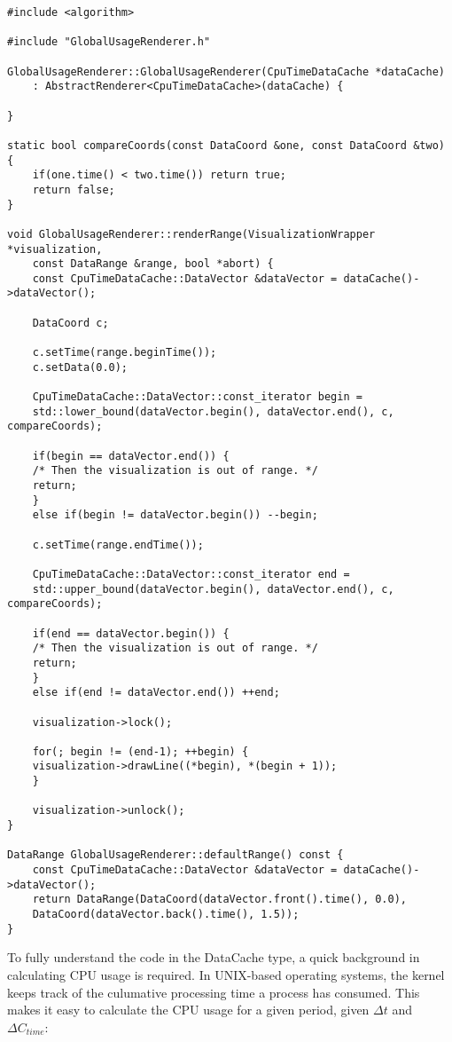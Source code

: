 \begin{lstlisting}
#include <algorithm>

#include "GlobalUsageRenderer.h"

GlobalUsageRenderer::GlobalUsageRenderer(CpuTimeDataCache *dataCache)
    : AbstractRenderer<CpuTimeDataCache>(dataCache) {
    
}

static bool compareCoords(const DataCoord &one, const DataCoord &two) {
    if(one.time() < two.time()) return true;
    return false;
}

void GlobalUsageRenderer::renderRange(VisualizationWrapper *visualization,
	const DataRange &range, bool *abort) {
    const CpuTimeDataCache::DataVector &dataVector = dataCache()->dataVector();
    
    DataCoord c;
    
    c.setTime(range.beginTime());
    c.setData(0.0);
    
    CpuTimeDataCache::DataVector::const_iterator begin =
	std::lower_bound(dataVector.begin(), dataVector.end(), c, compareCoords);
	
    if(begin == dataVector.end()) {
	/* Then the visualization is out of range. */
	return;
    }
    else if(begin != dataVector.begin()) --begin;
    
    c.setTime(range.endTime());
    
    CpuTimeDataCache::DataVector::const_iterator end =
	std::upper_bound(dataVector.begin(), dataVector.end(), c, compareCoords);
    
    if(end == dataVector.begin()) {
	/* Then the visualization is out of range. */
	return;
    }
    else if(end != dataVector.end()) ++end;
    
    visualization->lock();

    for(; begin != (end-1); ++begin) {
	visualization->drawLine((*begin), *(begin + 1));
    }
    
    visualization->unlock();
}

DataRange GlobalUsageRenderer::defaultRange() const {
    const CpuTimeDataCache::DataVector &dataVector = dataCache()->dataVector();
    return DataRange(DataCoord(dataVector.front().time(), 0.0),
	DataCoord(dataVector.back().time(), 1.5));
}

\end{lstlisting}

To fully understand the code in the DataCache type, a quick background in calculating CPU usage is required. In
UNIX-based operating systems, the kernel keeps track of the culumative processing time a process has consumed. This
makes it easy to calculate the CPU usage for a given period, given $\Delta t$ and $\Delta C_{time}$:

